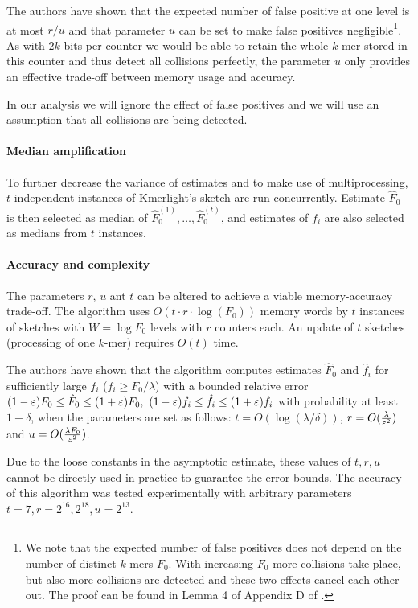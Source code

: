 The authors have shown that the expected number of false positive at one level
is at most $r/u$ and that parameter $u$ can be set to make false positives negligible\footnote{We 
note that the expected number of false positives does not depend on
the number of distinct $k$-mers $F_0$. With increasing $F_0$ more collisions take place,
but also more collisions are detected and these two effects cancel each other out. 
The proof can be found in Lemma 4 of Appendix D of \cite{Sivadasan2016}.}. As with $2k$ 
bits per counter we would be able to retain the whole $k$-mer stored in this 
counter and thus detect all collisions perfectly, the parameter $u$ only provides 
an effective trade-off between memory usage and accuracy.

In our analysis we will ignore the effect of false positives and we will use an assumption
that all collisions are being detected.

\paragraph{Median amplification}
To further decrease the variance of estimates and to make use of multiprocessing, 
$t$ independent instances of Kmerlight's sketch are run concurrently.
Estimate $\hat F_0$ is then selected as median of $\hat F_0^{(1)}, \dots, \hat F_0^{(t)}$, 
and estimates of $f_i$ are also selected as medians from $t$ instances. 

\paragraph{Accuracy and complexity}
The parameters $r$, $u$ ant $t$ can be altered to achieve a viable memory-accuracy trade-off.
The algorithm uses $O(t \cdot r \cdot \log(F_0))$ memory words by $t$ instances of sketches
with $W = \log F_0$ levels with $r$ counters each. 
An update of $t$ sketches (processing of one $k$-mer) requires $O(t)$ time.

The authors have shown that the algorithm computes estimates $\hat F_0$ and $\hat f_i$
for sufficiently large $f_i$ ($f_i \geq F_0 / \lambda$) with a bounded relative error 
$(1-\varepsilon)F_0 \leq \hat F_0 \leq (1+\varepsilon)F_0,~ (1-\varepsilon)f_i \leq \hat f_i \leq (1+\varepsilon)f_i$ with
probability at least $1 - \delta$, when the parameters are set as follows: 
$t = O(\log(\lambda/\delta))$, $r = O(\frac{\lambda}{\varepsilon^2})$
and $u = O(\frac{\lambda F_0}{\varepsilon^2})$. 

Due to the loose constants in the asymptotic estimate, these values of $t, r, u$ cannot be
directly used in practice to guarantee the error bounds. The accuracy of this algorithm was tested
experimentally with arbitrary parameters $t=7, r=2^{16}, 2^{18}, u=2^{13}$.
